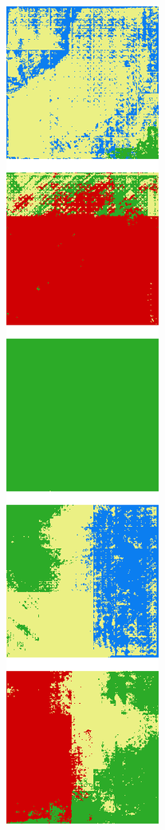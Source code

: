 \begin{figure}[h]
\begin{subfigure}{\DensenetPredictionsImageWidth}
        \caption{}
        \label{fig:densenet_pred_67d}
    \end{subfigure} \hspace{1mm}
    \begin{subfigure}{\DensenetPredictionsImageWidth}
        \includegraphics[width=\textwidth]{images/densenet/103d}

\end{subfigure}
\end{figure}
